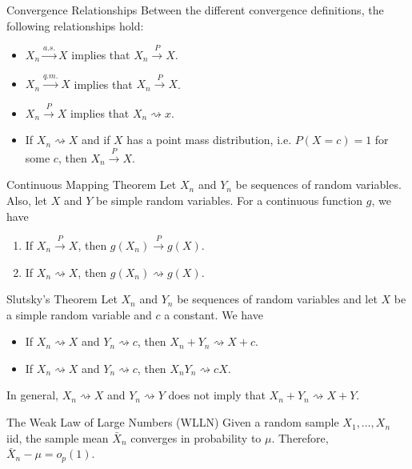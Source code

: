 \documentclass[avery5371,grid]{flashcards}
\begin{document}
\begin{flashcard}[Theorem]{Convergence Relationships}
Between the different convergence definitions, the following relationships hold:
\begin{itemize}
 \item $X_n \overset{a.s.}\longrightarrow X$ implies that $X_n \overset{P} \to X$.
 \item $X_n \overset{q.m.}\longrightarrow X$ implies that $X_n \overset{P}\to X$.
 \item $X_n \overset{P}\to X$ implies that $X_n \rightsquigarrow x$.
 \item If $X_n \rightsquigarrow X$ and if $X$ has a point mass distribution, i.e. $P(X=c)=1$ for some $c$, then $X_n \overset{P}\to X$.
\end{itemize}
\end{flashcard}

\begin{flashcard}[Theorem]{Continuous Mapping Theorem}
Let $X_n$ and $Y_n$ be sequences of random variables. Also, let $X$ and $Y$ be simple random variables. For a continuous function $g$, we have
\begin{enumerate}
 \item If $X_n \overset{P} \to X$, then $g(X_n) \overset{P} \to g(X)$.
 \item If $X_n \rightsquigarrow X$, then $g(X_n) \rightsquigarrow g(X)$.
\end{enumerate}
\end{flashcard}

\begin{flashcard}[Theorem]{Slutsky's Theorem}
Let $X_n$ and $Y_n$ be sequences of random variables and let $X$  be a simple random variable and $c$ a constant. We have 
\begin{itemize}
 \item If $X_n \rightsquigarrow X$ and $Y_n \rightsquigarrow c$, then $X_n + Y_n \rightsquigarrow X + c$.
 \item If $X_n \rightsquigarrow X$ and $Y_n \rightsquigarrow c$, then $X_nY_n \rightsquigarrow cX$.
\end{itemize}
In general, $X_n \rightsquigarrow X$ and $Y_n \rightsquigarrow Y$ does not imply that $X_n + Y_n \rightsquigarrow X + Y$.
\end{flashcard}

\begin{flashcard}[Theorem]{The Weak Law of Large Numbers (WLLN)}
Given a random sample $X_1, \ldots, X_n$ iid, the sample mean $\bar X_n$ converges in probability to $\mu$. Therefore, $\bar X_n - \mu = o_p(1)$. 
\end{flashcard}
\end{document}
